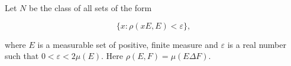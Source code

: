Let $N$ be the class of all sets of the form

$$\{x : \rho(xE, E) < \varepsilon\},$$

where $E$ is a measurable set of positive, finite measure and $\varepsilon$ is a real number such that $0 < \varepsilon < 2\mu(E)$. Here $\rho(E,F) = \mu(E \Delta F)$.
